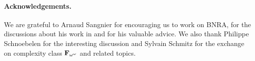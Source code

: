 \documentclass[runningheads]{llncs}
\begin{document}
	\paragraph*{Acknowledgements.} We are grateful to Arnaud Sangnier for encouraging us to work on BNRA, for the discussions about his work in \cite{DelzannoST13} and for his valuable advice. We also thank Philippe Schnoebelen for the interesting discussion and Sylvain Schmitz for the exchange on complexity class $\mathbf{F}_{\omega^{\omega}}$ and related topics.   
	
	
	\newpage
	
	\appendix
%	
	 
	
	

	
	
	
	
	
	
\end{document}

